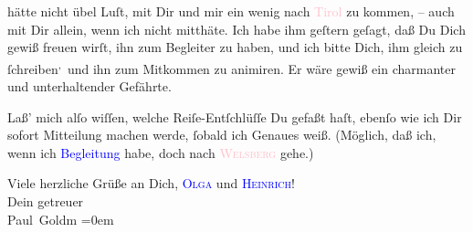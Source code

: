 \pstart
           \label{K_L03379-4v}\label{K_L03379-4h} hätte nicht übel
               Luſt, mit Dir und mir ein wenig nach \textcolor{pink}{Tirol}{}\ledrightnote{\textcolor{pink}{Tirol}{\newline}\textcolor{pink}{Südtirol}} zu kommen, – auch mit Dir allein, wenn ich nicht mitthäte. Ich habe
               ihm geſtern geſagt, daß Du Dich gewiß freuen wirſt,
               ihn zum Begleiter zu haben, und ich bitte Dich, ihm gleich zu ſchreiben\substVorne{}\textsuperscript{,}\substDazwischen{} und\substHinten{} ihn zum Mitkommen zu animiren. Er wäre gewiß ein charmanter und
               unterhaltender Gefährte.\pend
           
\pstart
           Laß’ mich alſo wiſſen, {\pb}welche Reiſe-Entſchlüſſe Du gefaßt haſt, ebenſo wie ich Dir sofort Mitteilung
               machen werde, ſobald ich Genaues weiß. (Möglich, daß ich, wenn ich \textcolor{blue}{Begleitung}{}\ledrightnote{{$\rightarrow$}\textcolor{blue}{Theodore Rottenberg}} habe, doch nach \textsc{\textcolor{pink}{Welsberg}{}\ledrightnote{\textcolor{pink}{Welsberg-Taisten}}} gehe.)\pend
           
\pstart
           Viele herzliche Grüße an Dich, \textsc{\textcolor{blue}{Olga}{}\ledrightnote{\textcolor{blue}{Olga Schnitzler}}} und \textsc{\textcolor{blue}{Heinrich}{}\ledrightnote{\textcolor{blue}{Heinrich Schnitzler}}}! {\\[\baselineskip]}Dein getreuer {\\[\baselineskip]}\spacefill\mbox{Paul Goldm}\pend
           \leftskip=0em{}\endnumbering{}
\begin{anhang}
\end{anhang}
      